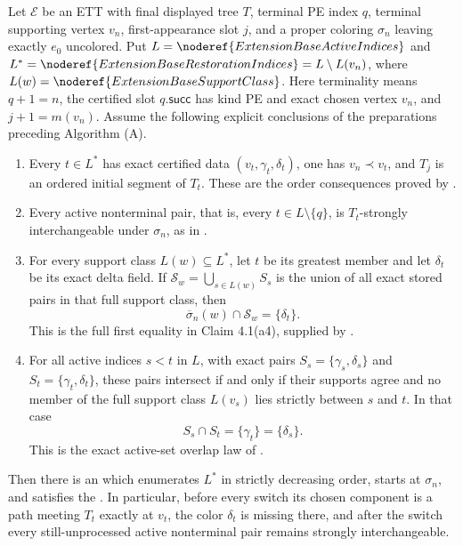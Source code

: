 \begin{lemma}
Let \(\mathcal E\) be an ETT with final displayed tree \(T\), terminal PE
index \(q\), terminal supporting vertex \(v_n\), first-appearance slot
\(j\), and a proper coloring \(\sigma_n\) leaving exactly \(e_0\)
uncolored.  Put
\(L=\noderef{ExtensionBaseActiveIndices}\) and
\(L^*=\noderef{ExtensionBaseRestorationIndices}=L\setminus L(v_n)\),
where \(L(w)=\noderef{ExtensionBaseSupportClass}\).  Here terminality
means \(q+1=n\), the certified slot \(q.\mathsf{succ}\) has kind PE and
exact chosen vertex \(v_n\), and \(j+1=m(v_n)\).  Assume the following
explicit conclusions of the preparations preceding Algorithm (A).
\begin{enumerate}
\item Every \(t\in L^*\) has exact certified data
      \((v_t,\gamma_t,\delta_t)\), one has \(v_n\prec v_t\), and \(T_j\)
      is an ordered initial segment of \(T_t\).  These are the order
      consequences proved by .
\item Every active nonterminal pair, that is, every \(t\in L\setminus
      \{q\}\), is \(T_t\)-strongly interchangeable under \(\sigma_n\),
      as in .
\item For every support class \(L(w)\subseteq L^*\), let \(t\) be its
      greatest member and let \(\delta_t\) be its exact delta field.  If
      \(\mathcal S_w=\bigcup_{s\in L(w)}S_s\) is the union of all exact
      stored pairs in that full support class, then
      \[
          \overline\sigma_n(w)\cap\mathcal S_w=\{\delta_t\}.    \tag{A4}
      \]
      This is the full first equality in Claim 4.1(a4), supplied by
      .
\item For all active indices \(s<t\) in \(L\), with exact pairs
      \(S_s=\{\gamma_s,\delta_s\}\) and
      \(S_t=\{\gamma_t,\delta_t\}\), these pairs intersect if and only
      if their supports agree and no member of the full support class
      \(L(v_s)\) lies strictly between \(s\) and \(t\).  In that case
      \[
                S_s\cap S_t=\{\gamma_t\}=\{\delta_s\}.          \tag{O}
      \]
      This is the exact active-set overlap law of
      .
\end{enumerate}
Then there is an  which enumerates
\(L^*\) in strictly decreasing order, starts at \(\sigma_n\), and
satisfies the .  In
particular, before every switch its chosen component is a path meeting
\(T_t\) exactly at \(v_t\), the color \(\delta_t\) is missing there, and
after the switch every still-unprocessed active nonterminal pair remains
strongly interchangeable.
\end{lemma}
